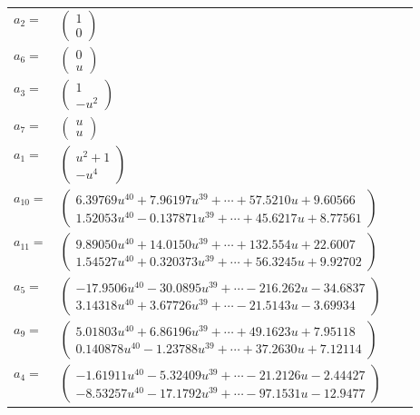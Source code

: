 \documentclass[1p]{elsarticle_modified}
\theoremstyle{definition}
\begin{document}
\begin{tabular}{m{7pt} m{180pt} m{7pt} m{180pt} }
\flushright $a_{2}=$&$\begin{pmatrix}1\\0\end{pmatrix}$ \\
\flushright $a_{6}=$&$\begin{pmatrix}0\\u\end{pmatrix}$ \\
\flushright $a_{3}=$&$\begin{pmatrix}1\\- u^2\end{pmatrix}$ \\
\flushright $a_{7}=$&$\begin{pmatrix}u\\u\end{pmatrix}$ \\
\flushright $a_{1}=$&$\begin{pmatrix}u^2+1\\- u^4\end{pmatrix}$ \\
\flushright $a_{10}=$&$\begin{pmatrix}6.39769 u^{40}+7.96197 u^{39}+\cdots+57.5210 u+9.60566\\1.52053 u^{40}-0.137871 u^{39}+\cdots+45.6217 u+8.77561\end{pmatrix}$ \\
\flushright $a_{11}=$&$\begin{pmatrix}9.89050 u^{40}+14.0150 u^{39}+\cdots+132.554 u+22.6007\\1.54527 u^{40}+0.320373 u^{39}+\cdots+56.3245 u+9.92702\end{pmatrix}$ \\
\flushright $a_{5}=$&$\begin{pmatrix}-17.9506 u^{40}-30.0895 u^{39}+\cdots-216.262 u-34.6837\\3.14318 u^{40}+3.67726 u^{39}+\cdots-21.5143 u-3.69934\end{pmatrix}$ \\
\flushright $a_{9}=$&$\begin{pmatrix}5.01803 u^{40}+6.86196 u^{39}+\cdots+49.1623 u+7.95118\\0.140878 u^{40}-1.23788 u^{39}+\cdots+37.2630 u+7.12114\end{pmatrix}$ \\
\flushright $a_{4}=$&$\begin{pmatrix}-1.61911 u^{40}-5.32409 u^{39}+\cdots-21.2126 u-2.44427\\-8.53257 u^{40}-17.1792 u^{39}+\cdots-97.1531 u-12.9477\end{pmatrix}$ \\

\end{tabular}
\end{document}
